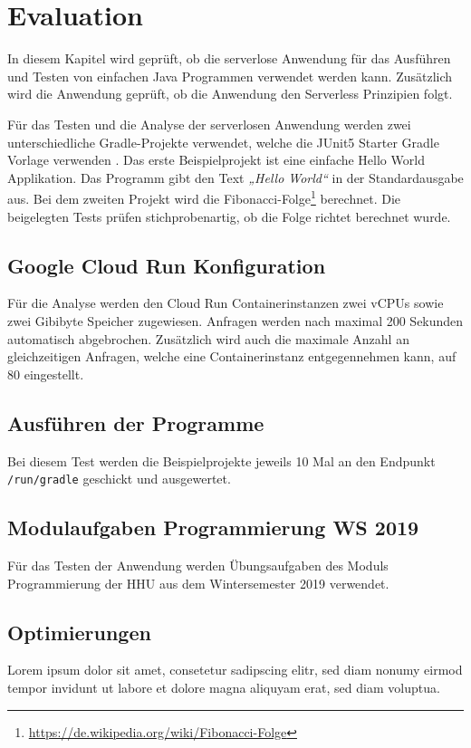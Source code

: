 \chapter{Evaluation}
In diesem Kapitel wird geprüft, ob die serverlose Anwendung
für das Ausführen und Testen von einfachen Java Programmen verwendet
werden kann. Zusätzlich wird die Anwendung geprüft,
ob die Anwendung den Serverless Prinzipien folgt.

Für das Testen und die Analyse der serverlosen Anwendung werden zwei unterschiedliche
Gradle-Projekte verwendet, welche die JUnit5 Starter Gradle Vorlage verwenden \cite{JunitStarterGradle}.
Das erste Beispielprojekt ist eine einfache
Hello World Applikation. Das Programm gibt den Text \emph{„Hello World“}
in der Standardausgabe aus. Bei dem zweiten Projekt wird
die Fibonacci-Folge\footnote{\url{https://de.wikipedia.org/wiki/Fibonacci-Folge}} berechnet.
Die beigelegten Tests prüfen stichprobenartig, ob die Folge richtet berechnet wurde.

\section{Google Cloud Run Konfiguration}
Für die Analyse werden den Cloud Run Containerinstanzen zwei vCPUs sowie zwei Gibibyte Speicher
zugewiesen. Anfragen werden nach maximal 200 Sekunden automatisch abgebrochen.
Zusätzlich wird auch die maximale Anzahl an gleichzeitigen Anfragen, welche eine Containerinstanz
entgegennehmen kann, auf 80 eingestellt.

\section{Ausführen der Programme}
Bei diesem Test werden die Beispielprojekte jeweils 10 Mal an
den Endpunkt \texttt{/run/gradle} geschickt und ausgewertet.


\section{Modulaufgaben Programmierung WS 2019}
Für das Testen der Anwendung werden Übungsaufgaben des Moduls Programmierung
der HHU aus dem Wintersemester 2019 verwendet. 

\section{Optimierungen}
Lorem ipsum dolor sit amet, consetetur sadipscing elitr,
sed diam nonumy eirmod tempor invidunt ut labore et dolore magna
aliquyam erat, sed diam voluptua.
